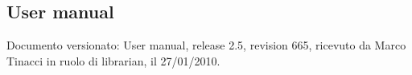 \subsection{User manual}
Documento versionato: User manual, release 2.5, revision 665, ricevuto da
Marco Tinacci in ruolo di librarian, il 27/01/2010.